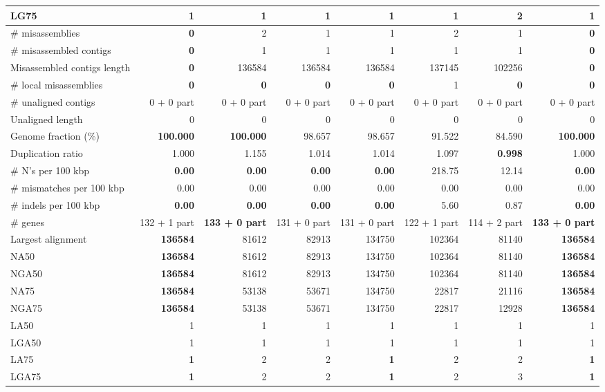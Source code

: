 \documentclass[12pt, twocolumn]{article}
\begin{document}
\begin{table}[h!]
\begin{center}
{\begin{tabular}{|l*{7}{|r}|}
LG75 & {\bf 1} & {\bf 1} & {\bf 1} & {\bf 1} & {\bf 1} & 2 & {\bf 1} \\ \hline
\# misassemblies & {\bf 0} & 2 & 1 & 1 & 2 & 1 & {\bf 0} \\ \hline
\# misassembled contigs & {\bf 0} & 1 & 1 & 1 & 1 & 1 & {\bf 0} \\ \hline
Misassembled contigs length & {\bf 0} & 136584 & 136584 & 136584 & 137145 & 102256 & {\bf 0} \\ \hline
\# local misassemblies & {\bf 0} & {\bf 0} & {\bf 0} & {\bf 0} & 1 & {\bf 0} & {\bf 0} \\ \hline
\# unaligned contigs & 0 + 0 part & 0 + 0 part & 0 + 0 part & 0 + 0 part & 0 + 0 part & 0 + 0 part & 0 + 0 part \\ \hline
Unaligned length & 0 & 0 & 0 & 0 & 0 & 0 & 0 \\ \hline
Genome fraction (\%) & {\bf 100.000} & {\bf 100.000} & 98.657 & 98.657 & 91.522 & 84.590 & {\bf 100.000} \\ \hline
Duplication ratio & 1.000 & 1.155 & 1.014 & 1.014 & 1.097 & {\bf 0.998} & 1.000 \\ \hline
\# N's per 100 kbp & {\bf 0.00} & {\bf 0.00} & {\bf 0.00} & {\bf 0.00} & 218.75 & 12.14 & {\bf 0.00} \\ \hline
\# mismatches per 100 kbp & 0.00 & 0.00 & 0.00 & 0.00 & 0.00 & 0.00 & 0.00 \\ \hline
\# indels per 100 kbp & {\bf 0.00} & {\bf 0.00} & {\bf 0.00} & {\bf 0.00} & 5.60 & 0.87 & {\bf 0.00} \\ \hline
\# genes & 132 + 1 part & {\bf 133 + 0 part} & 131 + 0 part & 131 + 0 part & 122 + 1 part & 114 + 2 part & {\bf 133 + 0 part} \\ \hline
Largest alignment & {\bf 136584} & 81612 & 82913 & 134750 & 102364 & 81140 & {\bf 136584} \\ \hline
NA50 & {\bf 136584} & 81612 & 82913 & 134750 & 102364 & 81140 & {\bf 136584} \\ \hline
NGA50 & {\bf 136584} & 81612 & 82913 & 134750 & 102364 & 81140 & {\bf 136584} \\ \hline
NA75 & {\bf 136584} & 53138 & 53671 & 134750 & 22817 & 21116 & {\bf 136584} \\ \hline
NGA75 & {\bf 136584} & 53138 & 53671 & 134750 & 22817 & 12928 & {\bf 136584} \\ \hline
LA50 & 1 & 1 & 1 & 1 & 1 & 1 & 1 \\ \hline
LGA50 & 1 & 1 & 1 & 1 & 1 & 1 & 1 \\ \hline
LA75 & {\bf 1} & 2 & 2 & {\bf 1} & 2 & 2 & {\bf 1} \\ \hline
LGA75 & {\bf 1} & 2 & 2 & {\bf 1} & 2 & 3 & {\bf 1} \\ \hline
\end{tabular}
}
\end{center}
\end{table}
\end{document}
